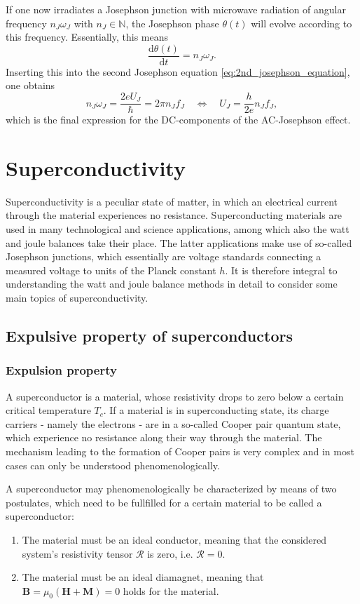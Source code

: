 \documentclass{report}
\numberwithin{tm}{section}
\newcommand\matr[1]{\ensuremath{\boldsymbol{\mathbf{#1}}}}
\newcommand\vect[1]{\ensuremath{\bm{#1}}}
\begin{document}
If one now irradiates a Josephson junction with microwave radiation of angular frequency $n_J\omega_J$ with $n_J \in \mathbb{N}$, the Josephson phase $\theta(t)$ will evolve according to this frequency. Essentially, this means \begin{equation}
	\frac{\mathrm{d}\theta(t)}{\mathrm{d}t} = n_J\omega_J.
\end{equation} Inserting this into the second Josephson equation \cref{eq:2nd_josephson_equation}, one obtains \begin{equation}
n_J\omega_J = \frac{2eU_J}{\hbar} = 2\pi n_Jf_J \quad \Leftrightarrow \quad U_J = \frac{h}{2e}n_Jf_J,
\end{equation} which is the final expression for the DC-components of the AC-Josephson effect.

	
\chapter{Superconductivity}
Superconductivity is a peculiar state of matter, in which an electrical current through the material experiences no resistance. Superconducting materials are used in many technological and science applications, among which also the watt and joule balances take their place. The latter applications make use of so-called Josephson junctions, which essentially are voltage standards connecting a measured voltage to units of the Planck constant $h$. It is therefore integral to understanding the watt and joule balance methods in detail to consider some main topics of superconductivity.

\section{Expulsive property of superconductors}

\subsection{Expulsion property}
A superconductor is a material, whose resistivity drops to zero below a certain critical temperature $T_c$. If a material is in superconducting state, its charge carriers - namely the electrons - are in a so-called Cooper pair quantum state, which experience no resistance along their way through the material. The mechanism leading to the formation of Cooper pairs is very complex and in most cases can only be understood phenomenologically. 

A superconductor may phenomenologically be characterized by means of two postulates, which need to be fullfilled for a certain material to be called a superconductor:
\begin{enumerate}
	\item The material must be an ideal conductor, meaning that the considered system's resistivity tensor $\matr{\mathcal{R}}$ is zero, i.e. $\matr{\mathcal{R}} = 0$.
	\item The material must be an ideal diamagnet, meaning that $\vect{B} = \mu_0(\vect{H}+\vect{M}) = 0$ holds for the material.
\end{enumerate}%
\end{document}
